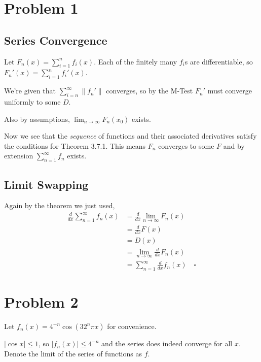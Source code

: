 \documentclass[12pt]{article}
\newcommand{\norm}[1]{\left\lVert#1\right\rVert}
\begin{document}
\section{Problem 1}

\subsection{Series Convergence}

Let $F_n(x)=\sum_{i=1}^n f_i(x)$.
Each of the finitely many $f_i$s are differentiable, so $F_n'(x)=\sum_{i=1}^n f_i'(x)$.

We're given that $\sum_{i=n}^\infty \norm{f_n'}$ converges,
so by the M-Test $F_n'$ must converge uniformly to some $D$.

Also by assumptions, $\lim_{n \to \infty} F_n(x_0)$ exists.

Now we see that the \textit{sequence} of functions and their associated derivatives
satisfy the conditions for Theorem 3.7.1.
This means $F_n$ converges to some $F$ and by extension $\sum_{n=1}^\infty f_n$ exists.

\subsection{Limit Swapping}

Again by the theorem we just used,
\begin{align*}
    \frac{d}{dx} \sum_{n=1}^\infty f_n(x)
    &=\frac{d}{dx} \lim_{n \to \infty} F_n(x) \\
    &=\frac{d}{dx} F(x) \\
    &= D(x) \\
    &= \lim_{n \to \infty} \frac{d}{dx} F_n(x) \\
    &= \sum_{n=1}^\infty \frac{d}{dx} f_n(x)\quad\square
\end{align*}

\pagebreak

\section{Problem 2}


Let $f_n(x)=4^{-n} \cos\left(32^n\pi x\right)$ for convenience.

$|\cos x| \le 1$, so $|f_n(x)| \le 4^{-n}$ and the series does indeed converge for all $x$.
Denote the limit of the series of functions as $f$.
\end{document}

